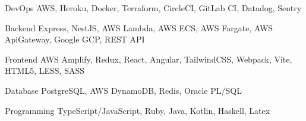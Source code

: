 

\begin{cvskills}

  \cvskill
    {DevOps} %
    {AWS, Heroku, Docker, Terraform, CircleCI, GitLab CI, Datadog, Sentry} %

  \cvskill
    {Backend} %
    {Express, NestJS, AWS Lambda, AWS ECS, AWS Fargate, AWS ApiGateway, Google GCP, REST API} %

  \cvskill
    {Frontend} %
    {AWS Amplify, Redux, React, Angular, TailwindCSS, Webpack, Vite, HTML5, LESS, SASS} %

  \cvskill
    {Database} %
    {PostgreSQL, AWS DynamoDB, Redis, Oracle PL/SQL} %
    
  \cvskill
    {Programming} %
    {TypeScript/JavaScript, Ruby, Java, Kotlin, Haskell, Latex} %


\end{cvskills}
